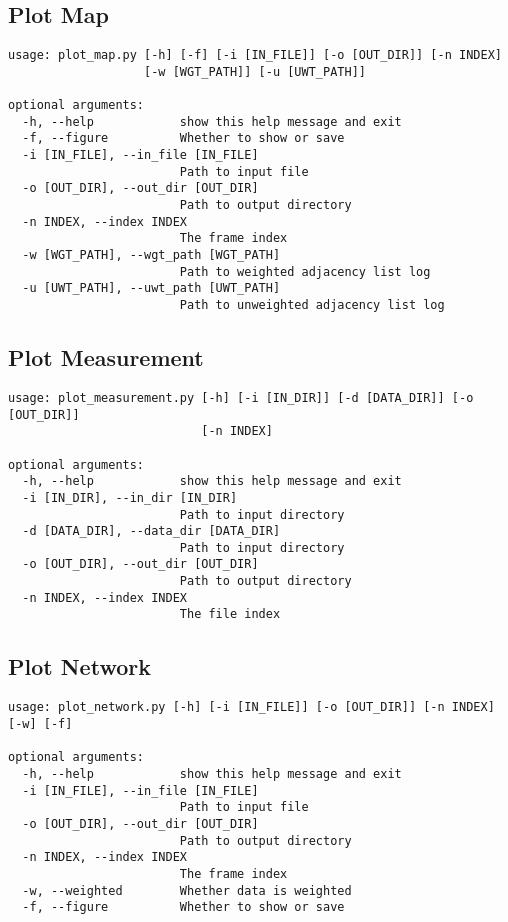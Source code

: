 \subsection{Plot Map}
\label{sec:org40aeaed}
\begin{verbatim}
usage: plot_map.py [-h] [-f] [-i [IN_FILE]] [-o [OUT_DIR]] [-n INDEX]
                   [-w [WGT_PATH]] [-u [UWT_PATH]]

optional arguments:
  -h, --help            show this help message and exit
  -f, --figure          Whether to show or save
  -i [IN_FILE], --in_file [IN_FILE]
                        Path to input file
  -o [OUT_DIR], --out_dir [OUT_DIR]
                        Path to output directory
  -n INDEX, --index INDEX
                        The frame index
  -w [WGT_PATH], --wgt_path [WGT_PATH]
                        Path to weighted adjacency list log
  -u [UWT_PATH], --uwt_path [UWT_PATH]
                        Path to unweighted adjacency list log
\end{verbatim}

\subsection{Plot Measurement}
\label{sec:org1737f2f}
\begin{verbatim}
usage: plot_measurement.py [-h] [-i [IN_DIR]] [-d [DATA_DIR]] [-o [OUT_DIR]]
                           [-n INDEX]

optional arguments:
  -h, --help            show this help message and exit
  -i [IN_DIR], --in_dir [IN_DIR]
                        Path to input directory
  -d [DATA_DIR], --data_dir [DATA_DIR]
                        Path to input directory
  -o [OUT_DIR], --out_dir [OUT_DIR]
                        Path to output directory
  -n INDEX, --index INDEX
                        The file index
\end{verbatim}

\subsection{Plot Network}
\label{sec:org037bf1f}
\begin{verbatim}
usage: plot_network.py [-h] [-i [IN_FILE]] [-o [OUT_DIR]] [-n INDEX] [-w] [-f]

optional arguments:
  -h, --help            show this help message and exit
  -i [IN_FILE], --in_file [IN_FILE]
                        Path to input file
  -o [OUT_DIR], --out_dir [OUT_DIR]
                        Path to output directory
  -n INDEX, --index INDEX
                        The frame index
  -w, --weighted        Whether data is weighted
  -f, --figure          Whether to show or save
\end{verbatim}

